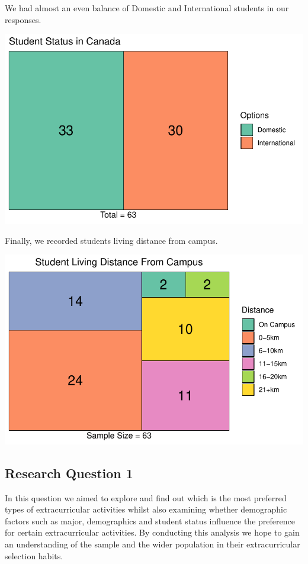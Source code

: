 \documentclass[
  letterpaper,
  DIV=11,
  numbers=noendperiod]{scrartcl}
\begin{document}
We had almost an even balance of Domestic and International students in
our responses.

\includegraphics{technical_report_files/figure-pdf/p4-1.pdf}

Finally, we recorded students living distance from campus.

\includegraphics{technical_report_files/figure-pdf/p5-1.pdf}

\subsection{Research Question 1}\label{research-question-1}

In this question we aimed to explore and find out which is the most
preferred types of extracurricular activities whilst also examining
whether demographic factors such as major, demographics and student
status influence the preference for certain extracurricular activities.
By conducting this analysis we hope to gain an understanding of the
sample and the wider population in their extracurricular selection
habits.
\end{document}
